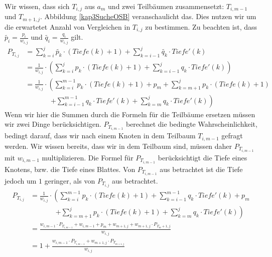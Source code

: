 Wir wissen, dass sich $T_{i,j}$ aus $a_m$ und zwei Teilbäumen zusammensetzt: $T_{i, m-1}$ und $T_{m+1,j}$. Abbildung \ref{kap3SucheOSB} veranschaulicht das. Dies nutzen wir um die erwartetet Anzahl von Vergleichen in $T_{i,j}$ zu bestimmen. Zu beachten ist, dass $\widetilde{p_i}=\frac{p_i}{w_{i,j}}$ und $\widetilde{q_i}=\frac{q_i}{w_{i,j}}$ gilt.
\begin{align*}
P_{T_{i,j}} &= \sum_{k=i}^{j} \widetilde{p_k} \cdot (Tiefe(k) + 1) + \sum_{k=i-1}^{j} \widetilde{q_k} \cdot Tiefe'(k) \\
	&= \frac{1}{w_{i,j}} \cdot \left( \sum_{k=i}^{j} p_k \cdot (Tiefe(k) + 1) + \sum_{k=i-1}^{j} q_k \cdot Tiefe'(k) \right)\\
	&= \frac{1}{w_{i,j}} \cdot \left( \sum_{k=i}^{m-1} p_k \cdot (Tiefe(k) + 1) + p_m + \sum_{k=m+1}^{j} p_k \cdot (Tiefe(k) + 1)\right. \\
	& \phantom{= \frac{1}{w_{i,j}}} \quad \left. + \sum_{k=i-1}^{m-1} q_k \cdot Tiefe'(k) + \sum_{k=m}^{j} q_k \cdot Tiefe'(k)\right)
\end{align*}
Wenn wir hier die Summen durch die Formeln für die Teilbäume ersetzen müssen wir zwei Dinge berücksichtigen. $P_{T_{i,m-1}}$ berechnet die bedingte Wahrscheinlichkeit, bedingt darauf, dass wir nach einem Knoten in dem Teilbaum $T_{i,m-1}$ gefragt werden. Wir wissen bereits, dass wir in dem Teilbaum sind, müssen daher $P_{T_{i,m-1}}$ mit $w_{i,m-1}$ multiplizieren. Die Formel für $P_{T_{i,m-1}}$ berücksichtigt die Tiefe eines Knotens, bzw. die Tiefe eines Blattes. Von $P_{T_{i,m-1}}$ aus betrachtet ist die Tiefe jedoch um $1$ geringer, als von $P_{T_{i,j}}$ aus betrachtet.
\begin{align*}
  P_{T_{i,j}} &= \frac{1}{w_{i,j}} \cdot \left( \sum_{k=i}^{m-1} p_k \cdot (Tiefe(k) + 1) + \sum_{k=i-1}^{m-1} q_k \cdot Tiefe'(k) + p_m \right.\\
    & \phantom{= \frac{1}{w_{i,j}}} \quad \left. + \sum_{k=m+1}^{j} p_k \cdot (Tiefe(k) + 1) + \sum_{k=m}^{j} q_k \cdot Tiefe'(k) \right)\\
    &= \frac{ w_{i,m-1} \cdot P_{T_{i,m-1}} +  w_{i,m-1} + p_m + w_{m+1, j} + w_{m+1,j} \cdot P_{T_m+1, j} }{w_{i,j}}\\
    &= 1 + \frac{w_{i,m-1} \cdot P_{T_{i,m-1}} + w_{m+1, j} \cdot P_{T_{m+1,j}}}{w_{i,j}}
\end{align*}

